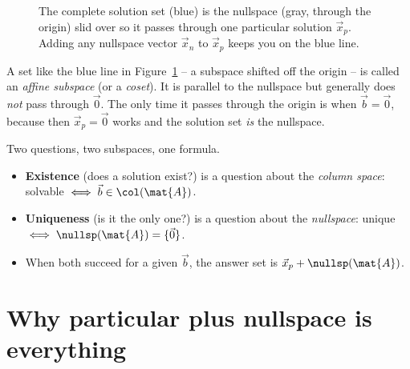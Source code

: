 \begin{figure}[H]
\centering
{}
\caption{The complete solution set (blue) is the nullspace (gray, through the origin)
slid over so it passes through one particular solution $\vec x_p$. Adding any nullspace
vector $\vec x_n$ to $\vec x_p$ keeps you on the blue line.}
\label{ch13:translate}
\end{figure}

A set like the blue line in Figure~\ref{ch13:translate} -- a subspace shifted off the
origin -- is called an \emph{affine subspace} (or a \emph{coset}). It is parallel to the
nullspace but generally does \emph{not} pass through $\vec{0}$. The only time it passes
through the origin is when $\vec{b}=\vec{0}$, because then $\vec{x}_p=\vec{0}$ works and the
solution set \emph{is} the nullspace.

\begin{focusbox}
Two questions, two subspaces, one formula.
\begin{itemize}
  \item \textbf{Existence} (does a solution exist?) is a question about the \emph{column
    space}: solvable $\iff \vec{b}\in\col(\mat{A})$.
  \item \textbf{Uniqueness} (is it the only one?) is a question about the
    \emph{nullspace}: unique $\iff \nullsp(\mat{A})=\{\vec{0}\}$.
  \item When both succeed for a given $\vec{b}$, the answer set is
    $\vec{x}_p+\nullsp(\mat{A})$.
\end{itemize}
\end{focusbox}

\section{Why particular plus nullspace is everything}

